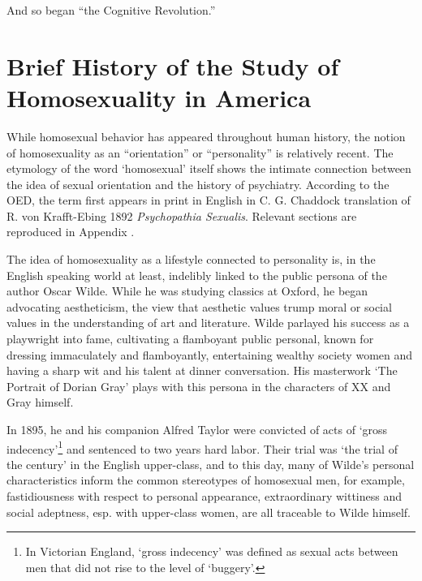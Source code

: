 \begin{refsection}
And so began “the Cognitive Revolution.”

\section{Brief History of the Study of Homosexuality in America}
\label{briefhistoryofthestudyofhomosexualityinamerica}

While homosexual behavior has appeared throughout human history, the notion of homosexuality as an “orientation” or “personality” is relatively recent. The etymology of the word `homosexual' itself shows the intimate connection between the idea of sexual orientation and the history of psychiatry. According to the OED, the term first appears in print in English in C. G. Chaddock translation of R. von Krafft-Ebing 1892 \emph{Psychopathia Sexualis}. Relevant sections are reproduced in Appendix .

The idea of homosexuality as a lifestyle connected to personality is, in the English speaking world at least, indelibly linked to the public persona of the author Oscar Wilde. While he was studying classics at Oxford, he began advocating aestheticism, the view that aesthetic values trump moral or social values in the understanding of art and literature. Wilde parlayed his success as a playwright into fame, cultivating a flamboyant public personal, known for dressing immaculately and flamboyantly, entertaining wealthy society women and having a sharp wit and his talent at dinner conversation. His masterwork ‘The Portrait of Dorian Gray’ plays with this persona in the characters of XX and Gray himself.

In 1895, he and his companion Alfred Taylor were convicted of acts of `gross indecency'\footnote{In Victorian England, `gross indecency' was defined as sexual acts between men that did not rise to the level of `buggery'.} and sentenced to two years hard labor. Their trial was `the trial of the century' in the English upper-class, and to this day, many of Wilde's personal characteristics inform the common stereotypes of homosexual men, for example, fastidiousness with respect to personal appearance, extraordinary wittiness and social adeptness, esp. with upper-class women, are all traceable to Wilde himself.


\end{refsection}

